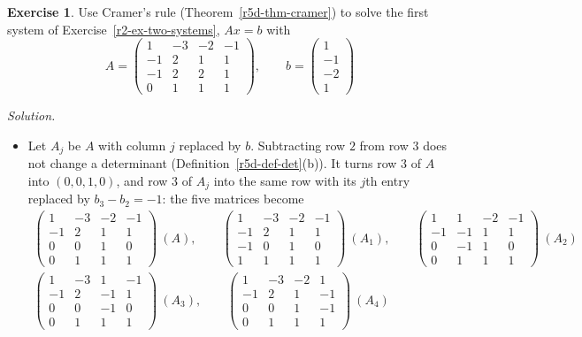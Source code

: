 \documentclass[12pt]{article}
\theoremstyle{definition}
\newtheorem{exercise}{Exercise}
\newenvironment{solution}{\par\noindent\textit{Solution.}\ }{\par\smallskip}
\begin{document}
\begin{exercise}\label{r5d-ex-cramer}
Use Cramer's rule (Theorem~\ref{r5d-thm-cramer}) to solve the first system of Exercise~\ref{r2-ex-two-systems},
\(Ax=b\) with
\[
A=\begin{pmatrix}1&-3&-2&-1\\-1&2&1&1\\-1&2&2&1\\0&1&1&1\end{pmatrix},\qquad
b=\begin{pmatrix}1\\-1\\-2\\1\end{pmatrix}
\]
\end{exercise}
\begin{solution}
\begin{itemize}
\item Let \(A_j\) be \(A\) with column \(j\) replaced by \(b\). Subtracting row \(2\) from row \(3\) does not change a
determinant (Definition~\ref{r5d-def-det}(b)). It turns row \(3\) of \(A\) into \((0,0,1,0)\), and row \(3\) of \(A_j\)
into the same row with its \(j\)th entry replaced by \(b_3-b_2=-1\): the five matrices become
\[
\begin{gathered}
\begin{pmatrix}1&-3&-2&-1\\-1&2&1&1\\0&0&1&0\\0&1&1&1\end{pmatrix}\ (A),\qquad
\begin{pmatrix}1&-3&-2&-1\\-1&2&1&1\\-1&0&1&0\\1&1&1&1\end{pmatrix}\ (A_1),\qquad
\begin{pmatrix}1&1&-2&-1\\-1&-1&1&1\\0&-1&1&0\\0&1&1&1\end{pmatrix}\ (A_2)\\
\begin{pmatrix}1&-3&1&-1\\-1&2&-1&1\\0&0&-1&0\\0&1&1&1\end{pmatrix}\ (A_3),\qquad
\begin{pmatrix}1&-3&-2&1\\-1&2&1&-1\\0&0&1&-1\\0&1&1&1\end{pmatrix}\ (A_4)

\end{gathered}\]
\end{itemize}
\end{solution}
\end{document}
